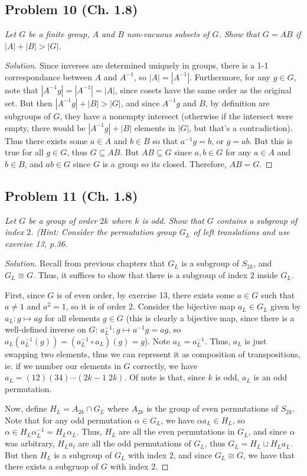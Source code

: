 \documentclass{article}
\begin{document}
\subsection*{Problem 10 (Ch. 1.8)}
{\it Let $G$ be a finite group, $A$ and $B$ non-vacuous subsets of $G$.
Show that $G = AB$ if $|A| + |B| > |G|$.}
\begin{proof}[Solution]\let\qed\relax
	Since inverses are determined uniquely in groups,
	there is a 1-1 correspondance between $A$ and $A^{-1}$,
	so $|A| = |A^{-1}|$.
	Furthermore, for any $g \in G$, note that $|A^{-1}g| = |A^{-1}| = |A|$,
	since cosets have the same order as the original set.
	But then $|A^{-1}g| + |B| > |G|$,
	and since $A^{-1}g$ and $B$, by definition are subgroups of $G$,
	they have a nonempty intersect
	(otherwise if the intersect were empty,
	there would be $|A^{-1}g| + |B|$ elements in $|G|$,
	but that's a contradiction).
	Thus there exists some $a \in A$ and $b \in B$ so that $a^{-1}g = b$,
	or $g = ab$.
	But this is true for all $g \in G$,
	thus $G \subseteq AB$.
	But $AB \subseteq G$ since $a,b \in G$ for any $a \in A$ and $b \in B$,
	and $ab \in G$ since $G$ is a group so its closed.
	Therefore, $AB = G$.
\end{proof}

\subsection*{Problem 11 (Ch. 1.8)}
{\it Let $G$ be a group of order $2k$ where $k$ is odd.
Show that $G$ contains a subgroup of index $2$.
(\emph{Hint:} Consider the permutation group $G_L$ of
left translations and use exercise 13, p.36.}
\begin{proof}[Solution]\let\qed\relax
	Recall from previous chapters that $G_L$ is a subgroup of $S_{2k}$,
	and $G_L \cong G$.
	Thus, it suffices to show that there is a subgroup
	of index $2$ inside $G_L$.

	First, since $G$ is of even order, by exercise 13,
	there exists some $a \in G$ such that $a \neq 1$ and $a^2 = 1$,
	so it is of order $2$.
	Consider the bijective map $a_L \in G_L$ given by
	$a_L \colon g \mapsto ag$
	for all elements $g \in G$
	(this is clearly a bijective map, since
	there is a well-defined inverse on $G$: $a^{-1}_L \colon g \mapsto a^{-1}g = ag$,
	so $a_L (a^{-1}_L (g)) = (a^{-1}_L \circ a_L) (g) = g$).
	Note $a_L = a^{-1}_L$.
	Thus, $a_L$ is just swapping two elements,
	thus we can represent it as composition of transpositions,
	ie. if we number our elements in $G$ correctly,
	we have $a_L  = (12)(34) \cdots (2k-1\;2k)$.
	Of note is that, since $k$ is odd, $a_L$ is an odd permutation.

	Now, define $H_L = A_{2k}\cap G_L$ where $A_{2k}$ is the
	group of even permutations of $S_{2k}$.
	Note that for any odd permutation $\alpha \in G_L$,
	we have $\alpha a_L \in H_L$,
	so $\alpha \in H_L \alpha_L^{-1} = H_L\alpha_L$.
	Thus, $H_L$ are all the even permutations in $G_L$,
	and since $\alpha$ was arbitrary, $H_La_l$ are all the
	odd permutations of $G_L$,
	thus $G_L = H_L \sqcup H_La_L$.
	But then $H_L$ is a subgroup of $G_L$ with index $2$,
	and since $G_L \cong G$,
	we have that there exists a subgruop of $G$ with index $2$.
\end{proof}
\end{document}
